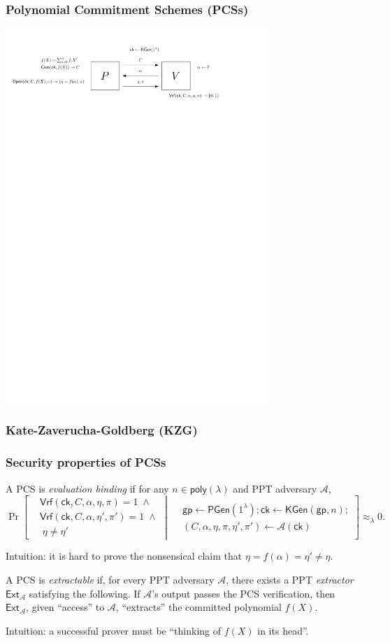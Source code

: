 \documentclass[9pt]{beamer}
\newcommand{\probability}[2]{
    \Pr
    \left[ 
    \begin{aligned}
    #1 \mspace{1mu}
    \end{aligned}
    \middle\vert
    \begin{aligned}
    \mspace{2mu} #2
    \end{aligned}
    \right]
}
\newcommand{\poly}{\mathsf{poly}}
\newcommand{\Pgen}{\mathsf{PGen}}
\newcommand{\KGen}{\mathsf{KGen}}
\newcommand{\V}{\mathsf{Vrf}}  %
\newcommand{\Ext}{\mathsf{Ext}}  %
\newcommand{\ck}{\mathsf{ck}}  %
\newcommand{\negligible}{\approx_{\lambda} 0}
\newcommand{\A}{\mathcal A}  %
\newcommand{\gp}{\mathsf{gp}}  %
\begin{document}
\begin{frame}
\frametitle{Polynomial Commitment Schemes (PCSs)}
    \includegraphics[width=10cm]{pcs-definition.pdf}
\end{frame}


\begin{frame}
\frametitle{Kate-Zaverucha-Goldberg (KZG)}
    
\end{frame}


\begin{frame}
\frametitle{Security properties of PCSs}
\begin{definition}
    A PCS is \emph{evaluation binding} if for any $ n \in \poly(\lambda) $ and PPT adversary $ \A $, 
    $$
    \probability{
    & \V(\ck, C, \alpha, \eta, \pi) = 1 \; \land \\ 
    & \V(\ck, C, \alpha, \eta', \pi') = 1 \; \land \\ 
    & \; \eta \neq \eta'
    }{
    & \gp \leftarrow \Pgen(1^\lambda); \ck \leftarrow \KGen(\gp, n); \\
    & (C, \alpha, \eta, \pi, \eta', \pi') \leftarrow \A(\ck)
    }
    \negligible.
    $$
\end{definition}
Intuition: it is hard to prove the nonsensical claim that $ \eta = f(\alpha) = \eta' \neq \eta $.
\begin{definition}[informal]
    A PCS is \textit{extractable} if, for every PPT adversary $ \A $, there exists a PPT \textit{extractor} $ \Ext_{\A} $ satisfying the following. If $ \A $'s output passes the PCS verification, then $ \Ext_\A $, given ``access'' to $ \A $, ``extracts'' the committed polynomial $ f(X) $.
\end{definition}
Intuition: a successful prover must be ``thinking of $ f(X) $ in its head''.
\end{frame}
\end{document}
